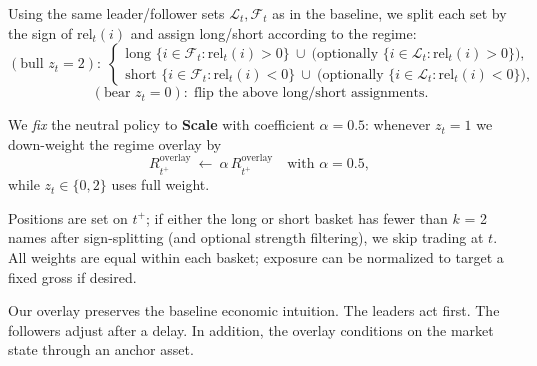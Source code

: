 
Using the same leader/follower sets $\mathcal{L}_t,\mathcal{F}_t$ as in the baseline, we split each set by the sign of $\mathrm{rel}_t(i)$ and assign long/short according to the regime:
\[
(\text{bull } z_t{=}2):\;
\begin{cases}
\text{long }\{i\in\mathcal{F}_t:\mathrm{rel}_t(i)>0\}\ \cup\ \big(\text{optionally }\{i\in\mathcal{L}_t:\mathrm{rel}_t(i)>0\}\big),\\
\text{short }\{i\in\mathcal{F}_t:\mathrm{rel}_t(i)<0\}\ \cup\ \big(\text{optionally }\{i\in\mathcal{L}_t:\mathrm{rel}_t(i)<0\}\big),
\end{cases}
\]
\[
(\text{bear } z_t{=}0):\;\text{flip the above long/short assignments.}
\]



We \emph{fix} the neutral policy to \textbf{Scale} with coefficient $\alpha=\mathbf{0.5}$:
whenever $z_t=1$ we down-weight the regime overlay by
\[
R^{\text{overlay}}_{t^+}\ \gets\ \alpha\,R^{\text{overlay}}_{t^+}\quad\text{with }\alpha=0.5,
\]
while $z_t\in\{0,2\}$ uses full weight. 

Positions are set on $t^+$; if either the long or short basket has fewer than $k$ = 2 names after sign-splitting (and optional strength filtering), we skip trading at $t$.
All weights are equal within each basket; exposure can be normalized to target a fixed gross if desired.

Our overlay preserves the baseline economic intuition. The leaders act first. The followers adjust after a delay. In addition, the overlay conditions on the market state through an anchor asset.

